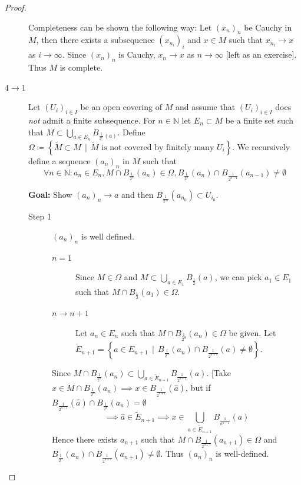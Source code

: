 \documentclass[a4paper]{article}
\numberwithin{lecref}{section}
\newcommand{\SetDef}[2]{\left\{#1\,\mid\,#2\right\}}
\begin{document}
\begin{proof}
\begin{description}
			Completeness can be shown the following way:
			Let $(x_n)_n$ be Cauchy in $M$, then there exists a subsequence $(x_{n_i})_i$ and $x \in M$ such that $x_{n_i} \to x$ as $i \to \infty$.
			Since $(x_n)_n$ is Cauchy, $x_n \to x$ as $n \to \infty$ [left as an exercise]. Thus $M$ is complete.
		\item[$4 \to 1$]
			Let $(U_i)_{i \in I}$ be an open covering of $M$ and assume that $(U_i)_{i \in I}$ does \emph{not} admit a finite subsequence.
			For $n \in \mathbb N$ let $E_n \subset M$ be a finite set such that $M \subset \bigcup_{a \in E_n} B_{\frac1{2^n}(a)}$.
			Define $\Omega \coloneqq \SetDef{\tilde M \subset M}{\tilde M \text{ is not covered by finitely many } U_i}$.
			We recursively define a sequence $(a_n)_n$ in $M$ such that
			\[ \forall n \in \mathbb N: a_n \in E_n, M \cap B_{\frac1{2^n}}(a_n) \in \Omega, B_{\frac{1}{2^n}}(a_n) \cap B_{\frac{1}{2^{n-1}}}(a_{n-1}) \neq \emptyset \]

			\textbf{Goal:} Show $(a_n)_n \to a$ and then $B_{\frac{1}{2^{n_0}}}(a_{n_0}) \subset U_{i_0}$.

			\begin{description}
				\item[Step 1]
					$(a_n)_n$ is well defined.
					\begin{description}
						\item[$n=1$] Since $M \in \Omega$ and $M \subset \bigcup_{a \in E_1} B_{\frac12}(a)$, we can pick $a_1 \in E_1$ such that $M \cap B_{\frac12}(a_1) \in \Omega$.
						\item[$n \to n+1$]
							Let $a_n \in E_n$ such that $M \cap B_{\frac1{2^n}}(a_n) \in \Omega$ be given.
							Let $\tilde E_{n+1} = \SetDef{a \in E_{n+1}}{B_{\frac1{2^n}}(a_n) \cap B_{\frac1{2^{n+1}}}(a) \neq \emptyset}$.
					\end{description}

					Since $M \cap B_{\frac1{2^n}}(a_n) \subset \bigcup_{a \in \tilde E_{n+1}} B_{\frac{1}{2^{n+1}}}(a)$.
					[Take $x \in M \cap B_{\frac1{2^n}}(a_n) \implies x \in B_{\frac{1}{2^{n+1}}}(\hat a)$, but if $B_{\frac1{2^{n-1}}}(\hat a) \cap B_{\frac1{2^n}}(a_n) = \emptyset$
					\[ \implies \hat a \in \tilde E_{n+1} \implies x \in \bigcup_{a \in \tilde E_{n+1}} B_{\frac{1}{a^{n+1}}}(a) \]
					Hence there exists $a_{n+1}$ such that $M \cap B_{\frac{1}{2^{n+1}}}(a_{n+1}) \in \Omega$ and $B_{\frac{1}{2^n}}(a_n) \cap B_{\frac{1}{2^{n-1}}}(a_{n+1}) \neq \emptyset$.
					Thus $(a_n)_n$ is well-defined.


\end{description}
\end{description}
\end{proof}
\end{document}
